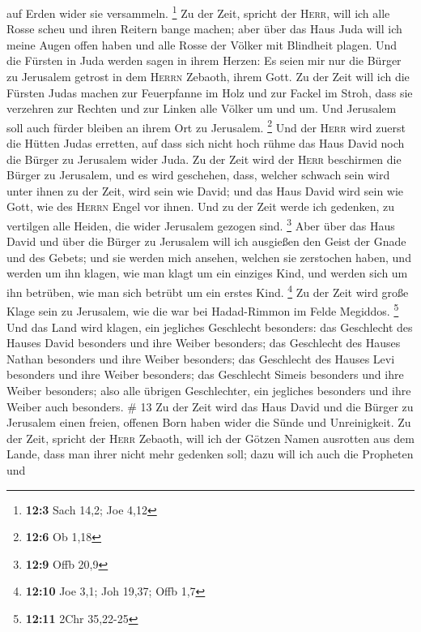 auf Erden wider sie versammeln. \footnote{\textbf{12:3} Sach 14,2; Joe
  4,12}  Zu der Zeit, spricht der \textsc{Herr}, will ich
alle Rosse scheu und ihren Reitern bange machen; aber über das Haus Juda
will ich meine Augen offen haben und alle Rosse der Völker mit Blindheit
plagen.  Und die Fürsten in Juda werden sagen in ihrem
Herzen: Es seien mir nur die Bürger zu Jerusalem getrost in dem
\textsc{Herrn} Zebaoth, ihrem Gott.  Zu der Zeit will ich
die Fürsten Judas machen zur Feuerpfanne im Holz und zur Fackel im
Stroh, dass sie verzehren zur Rechten und zur Linken alle Völker um und
um. Und Jerusalem soll auch fürder bleiben an ihrem Ort zu Jerusalem.
\footnote{\textbf{12:6} Ob 1,18}  Und der \textsc{Herr}
wird zuerst die Hütten Judas erretten, auf dass sich nicht hoch rühme
das Haus David noch die Bürger zu Jerusalem wider Juda. 
Zu der Zeit wird der \textsc{Herr} beschirmen die Bürger zu Jerusalem,
und es wird geschehen, dass, welcher schwach sein wird unter ihnen zu
der Zeit, wird sein wie David; und das Haus David wird sein wie Gott,
wie des \textsc{Herrn} Engel vor ihnen.  Und zu der Zeit
werde ich gedenken, zu vertilgen alle Heiden, die wider Jerusalem
gezogen sind. \footnote{\textbf{12:9} Offb 20,9}  Aber
über das Haus David und über die Bürger zu Jerusalem will ich ausgießen
den Geist der Gnade und des Gebets; und sie werden mich ansehen, welchen
sie zerstochen haben, und werden um ihn klagen, wie man klagt um ein
einziges Kind, und werden sich um ihn betrüben, wie man sich betrübt um
ein erstes Kind. \footnote{\textbf{12:10} Joe 3,1; Joh 19,37; Offb 1,7}
 Zu der Zeit wird große Klage sein zu Jerusalem, wie die
war bei Hadad-Rimmon im Felde Megiddos. \footnote{\textbf{12:11} 2Chr
  35,22-25}  Und das Land wird klagen, ein jegliches
Geschlecht besonders: das Geschlecht des Hauses David besonders und ihre
Weiber besonders; das Geschlecht des Hauses Nathan besonders und ihre
Weiber besonders;  das Geschlecht des Hauses Levi
besonders und ihre Weiber besonders; das Geschlecht Simeis besonders und
ihre Weiber besonders;  also alle übrigen Geschlechter,
ein jegliches besonders und ihre Weiber auch besonders. \# 13
 Zu der Zeit wird das Haus David und die Bürger zu
Jerusalem einen freien, offenen Born haben wider die Sünde und
Unreinigkeit.  Zu der Zeit, spricht der \textsc{Herr}
Zebaoth, will ich der Götzen Namen ausrotten aus dem Lande, dass man
ihrer nicht mehr gedenken soll; dazu will ich auch die Propheten und

